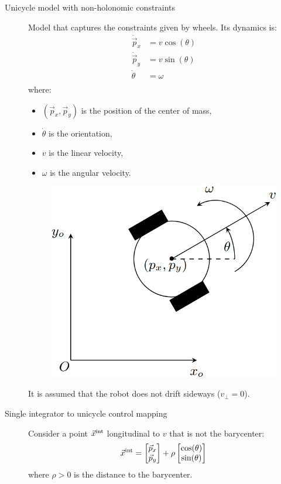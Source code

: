\begin{description}
    \item[Unicycle model with non-holonomic constraints] 
        Model that captures the constraints given by wheels. Its dynamics is:
        \[
            \begin{split}
                \dot{\vec{p}}_x &= v \cos(\theta) \\
                \dot{\vec{p}}_y &= v \sin(\theta) \\
                \dot{\theta} &= \omega \\
            \end{split}
        \]
        where:
        \begin{itemize}
            \item $(\vec{p}_x, \vec{p}_y)$ is the position of the center of mass,
            \item $\dot{\theta}$ is the orientation,
            \item $v$ is the linear velocity,
            \item $\omega$ is the angular velocity.
        \end{itemize}

        \begin{figure}[H]
            \centering
            \includegraphics[width=0.25\linewidth]{./img/unicycle_model.png}
        \end{figure}

        \begin{remark}
            It is assumed that the robot does not drift sideways ($v_{\bot} = 0$).
        \end{remark}

    \item[Single integrator to unicycle control mapping] 
        Consider a point ${\vec{x}}^\text{int}$ longitudinal to $v$ that is not the barycenter:
        \[
            {\vec{x}}^\text{int} = \begin{bmatrix}
                \vec{p}_x \\ \vec{p}_y
            \end{bmatrix}
            +
            \rho \begin{bmatrix}
                \cos(\theta) \\ \sin(\theta)
            \end{bmatrix}
        \]
        where $\rho > 0$ is the distance to the barycenter.


\end{description}

